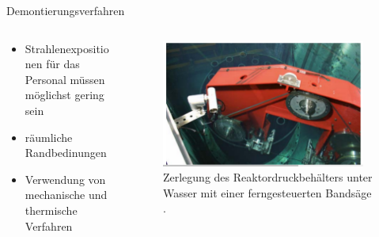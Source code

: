 \begin{frame}{Demontierungsverfahren}
  \begin{columns}

    \begin{column}{0.48\textwidth}
    \begin{itemize}
      \setlength\itemsep{1.2em}
      \item{Strahlenexpositionen für das Personal müssen möglichst gering sein }
      \item{ räumliche Randbedinungen }
      \item{ Verwendung von mechanische und thermische Verfahren }

    \end{itemize}

    \end{column}

    \begin{column}{0.48\textwidth}
      \begin{figure}
         \centering
         \includegraphics[width=0.95\textwidth]{./bilder/zerlegung_bandsaege.PNG}
         \caption{Zerlegung des Reaktordruckbehälters unter Wasser mit einer ferngesteuerten Bandsäge \cite{stilllegung_grs}. }
         \label{ fig: abbau_roboter}
       \end{figure}
    \end{column}

  \end{columns}
\end{frame}




